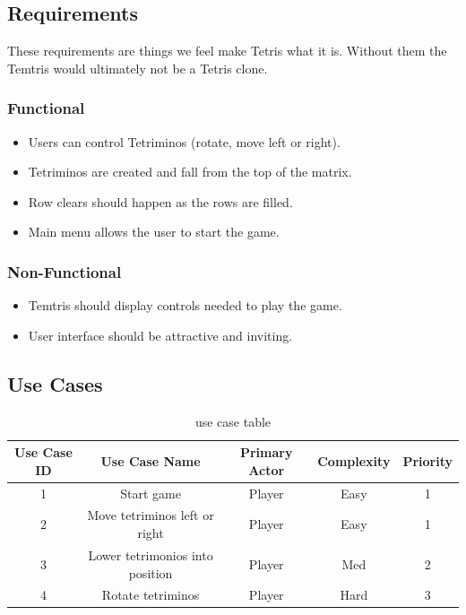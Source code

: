 \documentclass[10pt,conference,onecolumn,compsoc]{IEEEtran}
\begin{document}
\subsection{Requirements}
These requirements are things we feel make Tetris what it is. Without them the Temtris would ultimately not be a Tetris clone.

\subsubsection{Functional}
\begin{itemize}
\item Users can control Tetriminos (rotate, move left or right).
\item Tetriminos are created and fall from the top of the matrix.
\item Row clears should happen as the rows are filled.
\item Main menu allows the user to start the game.
\end{itemize}

\subsubsection{Non-Functional}
\begin{itemize}
\item Temtris should display controls needed to play the game.
\item User interface should be attractive and inviting.
\end{itemize}

\subsection{Use Cases}
\begin{table}[h!]
\centering
\begin{tabular}{|c|c|c|c|c|}
\hline
Use Case ID & Use Case Name & Primary Actor & Complexity & Priority \\
\hline \hline
1 & Start game & Player & Easy & 1\\
\hline
2 & Move tetriminos left or right & Player & Easy & 1\\
\hline
3 & Lower tetrimonios into position & Player & Med & 2\\
\hline
4 & Rotate tetriminos & Player & Hard & 3\\
\hline
\end{tabular}
\caption{use case table}
\label{tab:useCaseIndex}
\end{table}
\end{document}
